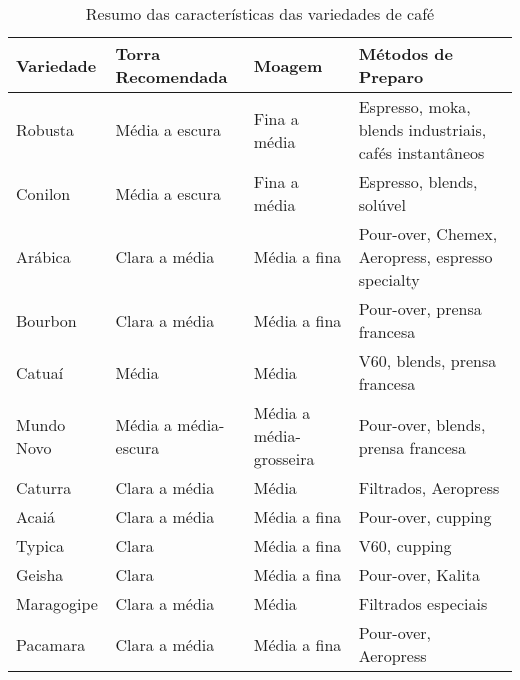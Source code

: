 \documentclass[a4paper,12pt]{article}
\begin{document}
\begin{table}[h!]
\centering
\caption{Resumo das características das variedades de café}
\begin{tabular}{|>{\raggedright\arraybackslash}p{3.5cm}|>{\raggedright\arraybackslash}p{2.5cm}|>{\raggedright\arraybackslash}p{2.5cm}|>{\raggedright\arraybackslash}p{4cm}|}
\hline
\textbf{Variedade} & \textbf{Torra Recomendada} & \textbf{Moagem} & \textbf{Métodos de Preparo} \\
\hline
Robusta & Média a escura & Fina a média & Espresso, moka, blends industriais, cafés instantâneos \\
\hline
Conilon & Média a escura & Fina a média & Espresso, blends, solúvel \\
\hline
Arábica & Clara a média & Média a fina & Pour-over, Chemex, Aeropress, espresso specialty \\
\hline
Bourbon & Clara a média & Média a fina & Pour-over, prensa francesa \\
\hline
Catuaí & Média & Média & V60, blends, prensa francesa \\
\hline
Mundo Novo & Média a média-escura & Média a média-grosseira & Pour-over, blends, prensa francesa \\
\hline
Caturra & Clara a média & Média & Filtrados, Aeropress \\
\hline
Acaiá & Clara a média & Média a fina & Pour-over, cupping \\
\hline
Typica & Clara & Média a fina & V60, cupping \\
\hline
Geisha & Clara & Média a fina & Pour-over, Kalita \\
\hline
Maragogipe & Clara a média & Média & Filtrados especiais \\
\hline
Pacamara & Clara a média & Média a fina & Pour-over, Aeropress \\
\hline
\end{tabular}
\end{table}




\nocite{counterculture_pourover}
\nocite{embrapa_catalog}
\nocite{perfectdailygrind_geisha}
\nocite{sca_brewing_chart}
\nocite{sca_standard_pdf}
\nocite{wcr_varieties}
\nocite{wikipedia_geisha}
\end{document}
